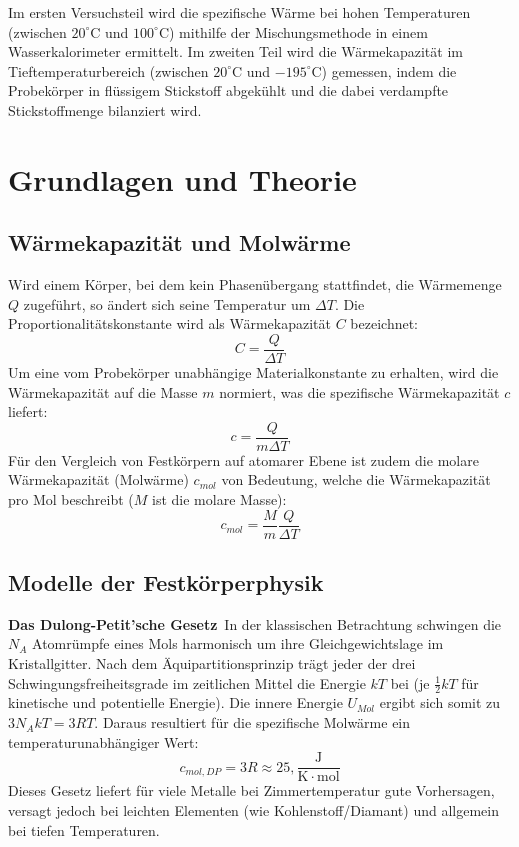 \documentclass[12pt,a4paper,titlepage]{scrartcl}
\numberwithin{equation}{section}
\numberwithin{table}{section}
\numberwithin{figure}{section}
\begin{document}
Im ersten Versuchsteil wird die spezifische Wärme bei hohen Temperaturen (zwischen $20^{\circ}\mathrm{C}$ und $100^{\circ}\mathrm{C}$) mithilfe der Mischungsmethode in einem Wasserkalorimeter ermittelt. Im zweiten Teil wird die Wärmekapazität im Tieftemperaturbereich (zwischen $20^{\circ}\mathrm{C}$ und $-195^{\circ}\mathrm{C}$) gemessen, indem die Probekörper in flüssigem Stickstoff abgekühlt und die dabei verdampfte Stickstoffmenge bilanziert wird.

\section{Grundlagen und Theorie}\label{sec:grundlagen-und-theorie}

\subsection{Wärmekapazität und Molwärme}
Wird einem Körper, bei dem kein Phasenübergang stattfindet, die Wärmemenge $Q$ zugeführt, so ändert sich seine Temperatur um $\Delta T$. Die Proportionalitätskonstante wird als Wärmekapazität $C$ bezeichnet:
\begin{equation}
C = \frac{Q}{\Delta T}
\end{equation}
Um eine vom Probekörper unabhängige Materialkonstante zu erhalten, wird die Wärmekapazität auf die Masse $m$ normiert, was die spezifische Wärmekapazität $c$ liefert:
\begin{equation}
c = \frac{Q}{m \Delta T}
\end{equation}
Für den Vergleich von Festkörpern auf atomarer Ebene ist zudem die molare Wärmekapazität (Molwärme) $c_{mol}$ von Bedeutung, welche die Wärmekapazität pro Mol beschreibt ($M$ ist die molare Masse):
\begin{equation}
c_{mol} = \frac{M}{m} \frac{Q}{\Delta T}
\end{equation}

\subsection{Modelle der Festkörperphysik}

\textbf{Das Dulong-Petit'sche Gesetz}\
In der klassischen Betrachtung schwingen die $N_A$ Atomrümpfe eines Mols harmonisch um ihre Gleichgewichtslage im Kristallgitter. Nach dem Äquipartitionsprinzip trägt jeder der drei Schwingungsfreiheitsgrade im zeitlichen Mittel die Energie $k T$ bei (je $\frac{1}{2} k T$ für kinetische und potentielle Energie). Die innere Energie $U_{Mol}$ ergibt sich somit zu $3 N_A k T = 3 R T$. Daraus resultiert für die spezifische Molwärme ein temperaturunabhängiger Wert:
\begin{equation}
c_{mol, DP} = 3 R \approx 25,\mathrm{\frac{J}{K \cdot mol}}
\end{equation}
Dieses Gesetz liefert für viele Metalle bei Zimmertemperatur gute Vorhersagen, versagt jedoch bei leichten Elementen (wie Kohlenstoff/Diamant) und allgemein bei tiefen Temperaturen.
\end{document}
